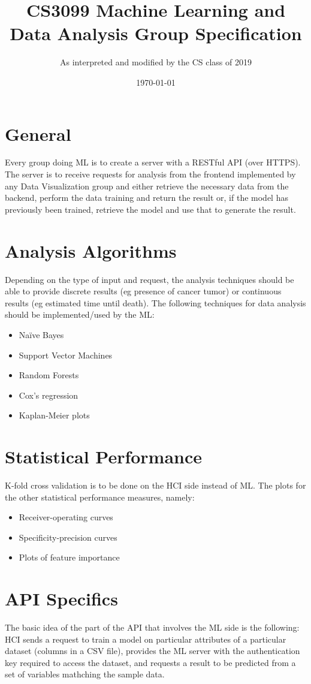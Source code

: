 \documentclass{article}
\title{CS3099 Machine Learning and Data Analysis Group Specification}
\author{As interpreted and modified by the CS class of 2019}
\date{\today}
\begin{document}
\maketitle

\section{General}
Every group doing ML is to create a server with a RESTful API (over HTTPS). The server is to receive requests for analysis from the frontend implemented by any Data Visualization group and either retrieve the necessary data from the backend, perform the data training and return the result or, if the model has previously been trained, retrieve the model and use that to generate the result.

\section{Analysis Algorithms}
Depending on the type of input and request, the analysis techniques should be able to provide discrete results (eg presence of cancer tumor) or continuous results (eg estimated time until death). The following techniques for data analysis should be implemented/used by the ML:

\begin{itemize}
    \item Na\"ive Bayes
    \item Support Vector Machines
    \item Random Forests
    \item Cox's regression
    \item Kaplan-Meier plots
\end{itemize}

\section{Statistical Performance}
K-fold cross validation is to be done on the HCI side instead of ML. The plots for the other statistical performance measures, namely:

\begin{itemize}
    \item Receiver-operating curves
    \item Specificity-precision curves
    \item Plots of feature importance
\end{itemize}

\section{API Specifics}
The basic idea of the part of the API that involves the ML side is the following: HCI sends a request to train a model on particular attributes of a particular dataset (columns in a CSV file), provides the ML server with the authentication key required to access the dataset, and requests a result to be predicted from a set of variables mathching the sample data.
\end{document}
